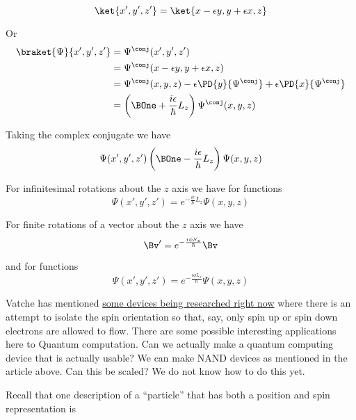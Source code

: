 \begin{equation}\label{eqn:PHY356FDec7:140}
\ket{x', y', z'} = \ket{x - \epsilon y, y + \epsilon x, z}
\end{equation}

Or
\begin{align*}
\braket{\Psi}{x', y', z'}
&=
\Psi^\conj(x', y', z') \\
&=
\Psi^\conj(x - \epsilon y, y + \epsilon x, z) \\
&=
\Psi^\conj(x , y , z)
- \epsilon \PD{y}{\Psi^\conj}
+ \epsilon \PD{x}{\Psi^\conj} \\
&=
\left( \BOne + \frac{i \epsilon} {\hbar} L_z \right) \Psi^\conj(x , y , z)
\end{align*}

Taking the complex conjugate we have
\begin{equation}\label{eqn:PHY356FDec7:150}
\Psi(x', y', z')
\left( \BOne - \frac{i \epsilon} {\hbar} L_z \right) \Psi(x , y , z)
\end{equation}

For infinitesimal rotations about the $z$ axis we have for functions
\begin{equation}\label{eqn:PHY356FDec7:160}
\Psi(x', y', z')
=
e^{ - \frac{i \epsilon} {\hbar} L_z } \Psi(x , y , z)
\end{equation}

For finite rotations of a vector about the $z$ axis we have
\begin{equation}\label{eqn:PHY356FDec7:170}
\Bv'
=
e^{ -\frac{i \phi S_z} {\hbar} } \Bv
\end{equation}

and for functions
\begin{equation}\label{eqn:PHY356FDec7:180}
\Psi(x', y', z')
=
e^{ - \frac{i \phi L_z} {\hbar} } \Psi(x , y , z)
\end{equation}

Vatche has mentioned \href{http://plato.stanford.edu/entries/qt-quantcomp/#2.2}{some devices being researched right now} where there is an attempt to isolate the spin orientation so that, say, only spin up or spin down electrons are allowed to flow.  There are some possible interesting applications here to Quantum computation.  Can we actually make a quantum computing device that is actually usable?  We can make NAND devices as mentioned in the article above.  Can this be scaled?  We do not know how to do this yet.

Recall that one description of a ``particle'' that has both a position and spin representation is

